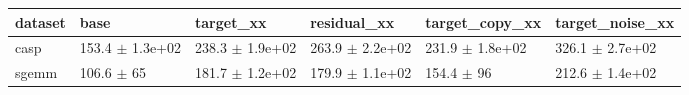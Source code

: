 \begin{tabular}{llllll}
\toprule
dataset & base & target\_xx & residual\_xx & target\_copy\_xx & target\_noise\_xx \\
\midrule
casp & 153.4 $\pm$ 1.3e+02 & 238.3 $\pm$ 1.9e+02 & 263.9 $\pm$ 2.2e+02 & 231.9 $\pm$ 1.8e+02 & 326.1 $\pm$ 2.7e+02 \\
sgemm & 106.6 $\pm$ 65 & 181.7 $\pm$ 1.2e+02 & 179.9 $\pm$ 1.1e+02 & 154.4 $\pm$ 96 & 212.6 $\pm$ 1.4e+02 \\
\bottomrule
\end{tabular}
